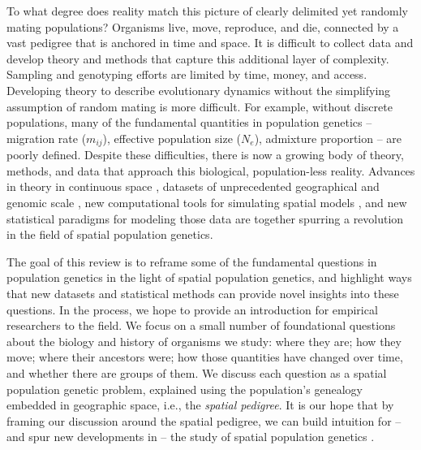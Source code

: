 \documentclass{ar-1col}
\newcommand{\g}[1]{{\color{blue}{#1}}}
\begin{document}
To what degree does reality match this picture
of clearly delimited yet randomly mating populations?
Organisms live, move, reproduce, and die,
connected by a vast pedigree that is anchored in time and space.
It is difficult to collect data and develop theory and methods
that capture this additional layer of complexity.
Sampling and genotyping efforts are limited by time, money, and access.
Developing theory to describe evolutionary dynamics
without the simplifying assumption of random mating
is more difficult.
For example, without discrete populations,
many of the fundamental quantities in population genetics -- 
migration rate ($m_{ij}$), 
effective population size ($N_e$),
admixture proportion
--
are poorly defined.
Despite these difficulties,
there is now a growing body of theory, methods, and data
that approach this biological, population-less reality.
Advances in theory in continuous space 
\citep{felsenstein1975pain,BartonWilson1995,barton-depaulis-etheridge, barton2010modelling, barton2010newmodel, Barton2013},
datasets of unprecedented geographical and genomic scale 
\citep[e.g.,][]{POBI, Aguillon2017deconstructing, Shaffer195743},
new computational tools for simulating spatial models \citep{haller2018forward,haller2018treesequence},
and new statistical paradigms for modeling those data 
\citep{petkova2016visualizing, ringbauer2017inferring, ringbauer2018estimating, conStruct, alasadi2018estimating}
\g{cite IBD-tract stuff and rare allele stuff (JoNo and Slatkin)}
are together spurring a revolution in the field of spatial population genetics.

The goal of this review
is to reframe some of the fundamental questions in population genetics 
in the light of spatial population genetics, 
and highlight ways that new datasets and 
statistical methods can provide novel insights into these questions.
In the process, 
we hope to provide an introduction for empirical researchers
to the field.
We focus on a small number of foundational questions 
about the biology and history of organisms we study:
where they are; how they move; where their ancestors were;
how those quantities have changed over time, 
and whether there are groups of them.
We discuss each question
as a spatial population genetic problem, 
explained using the 
population's genealogy embedded in geographic space,
i.e., the \emph{spatial pedigree}.
It is our hope that by framing our discussion around the spatial pedigree, 
we can build intuition for --
and spur new developments in --
the study of spatial population genetics .
\end{document}
